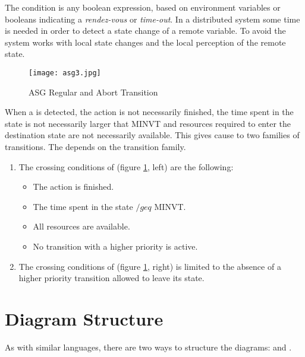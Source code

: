 \documentclass[../main.tex]{subfiles}
\begin{document}
The condition is any boolean expression, based on environment variables or booleans indicating a \textit{rendez-vous} or \textit{time-out}.
In a distributed system some time is needed in order to detect a state change of a remote variable.
To avoid  the system works with local state changes and the local perception of the remote state.
\begin{figure}[H]
    \centering
    \texttt{[image: asg3.jpg]}
    \caption{ASG Regular and Abort Transition}
    \label{asg3}
\end{figure}
When a  is detected, the action is not necessarily finished, the time spent in the state is not necessarily larger that MINVT and resources required to enter the destination state are not necessarily available. This gives cause to two families of transitions. The  depends on the transition family.
\begin{enumerate}
	\item  The crossing conditions of  (figure \ref{asg3}, left) are the following:
	\begin{itemize}
		\item The action is finished.
		\item The time spent in the state $/geq$ MINVT.
		\item All resources are available.
		\item No transition with a higher priority is active.
	\end{itemize}
	\item The crossing conditions of  (figure \ref{asg3}, right) is limited to the absence of a higher priority transition allowed to leave its state.
\end{enumerate}

\section{Diagram Structure}
As with similar languages, there are two ways to structure the diagrams:  and .
\end{document}
